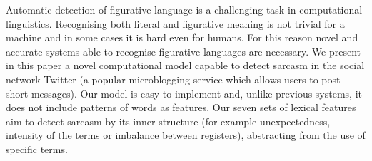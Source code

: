 Automatic detection of figurative language is a challenging task in computational linguistics. Recognising both literal and figurative meaning is not trivial for a machine and in some cases it is hard even for humans. For this reason novel and accurate systems able to recognise figurative languages are necessary. We present in this paper a novel computational model capable to detect sarcasm in the social network Twitter (a popular microblogging service which allows users to post short messages). Our model is easy to implement and, unlike previous systems, it does not include patterns of words as features. Our seven sets of lexical features aim to detect sarcasm by its inner structure (for example unexpectedness, intensity of the terms or imbalance between registers), abstracting from the use of specific terms.

